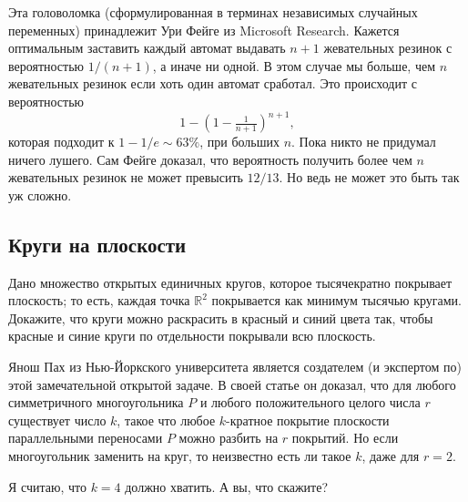 \medskip

Эта головоломка (сформулированная в терминах независимых случайных переменных) принадлежит Ури Фейге из Microsoft Research.
Кажется оптимальным заставить каждый автомат выдавать $n + 1$ жевательных резинок с вероятностью $1/(n + 1)$,
а иначе ни одной.
В этом случае мы больше, чем $n$ жевательных резинок если хоть один автомат сработал.
Это происходит с вероятностью
\[1-(1-\tfrac1{n+1})^{n+1},\]
которая подходит к $1 - 1/e \sim 63\%$, при больших $n$.
Пока никто не придумал ничего лушего.
Сам Фейге доказал, что вероятность получить более чем $n$ жевательных резинок не может превысить $12/13$.
Но ведь не может это быть так уж сложно.

\subsection*{Круги на плоскости}

Дано множество открытых единичных кругов, которое тысячекратно покрывает плоскость;
то есть, каждая точка $\mathbb{R}^2$ покрывается как минимум тысячью кругами.
Докажите, что круги можно раскрасить в красный и синий цвета так,
чтобы красные и синие круги по отдельности покрывали всю плоскость.

\medskip

Янош Пах из Нью-Йоркского университета является создателем (и экспертом по) этой замечательной открытой задаче.
В своей статье \cite{46} он доказал, что для любого симметричного многоугольника $P$ и любого положительного целого числа $r$ существует число $k$, такое что любое $k$-кратное покрытие плоскости параллельными переносами $P$ можно разбить на $r$ покрытий.
Но если многоугольник заменить на круг, то неизвестно есть ли такое $k$, даже для $r = 2$.

Я считаю, что $k = 4$ должно хватить.
А вы, что скажите?
